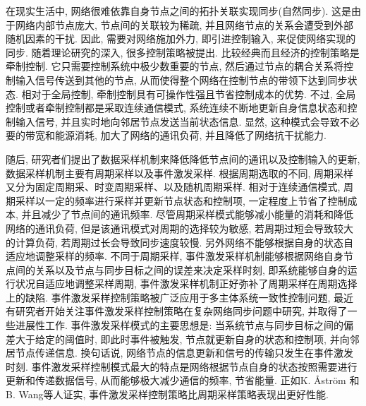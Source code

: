 在现实生活中, 网络很难依靠自身节点之间的拓扑关联实现同步(自然同步). 这是由于网络内部节点庞大, 节点间的关联较为稀疏, 并且网络节点的关系会遭受到外部随机因素的干扰. 因此, 需要对网络施加外力, 即引进控制输入, 来促使网络实现的同步.
随着理论研究的深入, 很多控制策略被提出. 比较经典而且经济的控制策略是牵制控制. 它只需要控制系统中极少数重要的节点, 然后通过节点的耦合关系将控制输入信号传送到其他的节点, 从而使得整个网络在控制节点的带领下达到同步状态. 相对于全局控制, 牵制控制具有可操作性强且节省控制成本的优势.
不过, 全局控制或者牵制控制都是采取连续通信模式, 系统连续不断地更新自身信息状态和控制输入信号, 并且实时地向邻居节点发送当前状态信息. 显然, 这种模式会导致不必要的带宽和能源消耗, 加大了网络的通讯负荷, 并且降低了网络抗干扰能力.

随后, 研究者们提出了数据采样机制来降低降低节点间的通讯以及控制输入的更新, 数据采样机制主要有周期采样以及事件激发采样. 根据周期选取的不同, 周期采样又分为固定周期采、时变周期采样、以及随机周期采样. 相对于连续通信模式, 周期采样以一定的频率进行采样并更新节点状态和控制项, 一定程度上节省了控制成本, 并且减少了节点间的通讯频率. 尽管周期采样模式能够减小能量的消耗和降低网络的通讯负荷, 但是该通讯模式对周期的选择较为敏感, 若周期过短会导致较大的计算负荷, 若周期过长会导致同步速度较慢. 另外网络不能够根据自身的状态自适应地调整采样的频率. 不同于周期采样, 事件激发采样机制能够根据网络自身节点间的关系以及节点与同步目标之间的误差来决定采样时刻, 即系统能够自身的运行状况自适应地调整采样周期, 事件激发采样机制正好弥补了周期采样在周期选择上的缺陷. 事件激发采样控制策略被广泛应用于多主体系统一致性控制问题, 最近有研究者开始关注事件激发采样控制策略在复杂网络同步问题中研究, 并取得了一些进展性工作. 事件激发采样模式的主要思想是: 当系统节点与同步目标之间的偏差大于给定的阈值时, 即此时事件被触发, 节点就更新自身的状态和控制项, 并向邻居节点传递信息. 换句话说, 网络节点的信息更新和信号的传输只发生在事件激发时刻. 事件激发采样控制模式最大的特点是网络根据节点自身的状态按照需要进行更新和传递数据信号, 从而能够极大减少通信的频率, 节省能量. 正如K. {\AA}ström 和B. Wang等人证实, 事件激发采样控制策略比周期采样策略表现出更好性能.

